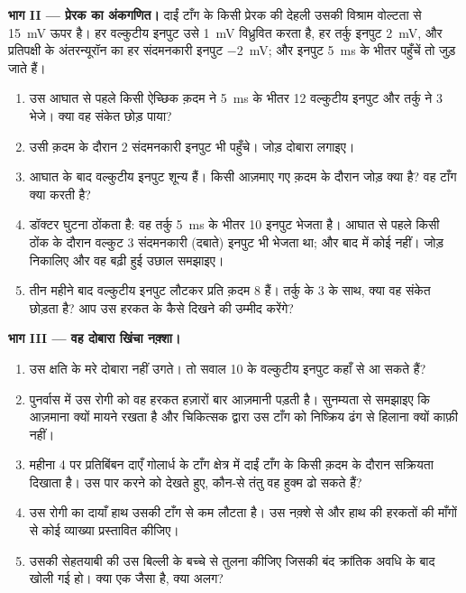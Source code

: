 \begin{problem}
\medskip
\noindent\textbf{भाग II --- प्रेरक  का अंकगणित।}
दाईं टाँग के किसी प्रेरक  की देहली उसकी विश्राम वोल्टता से
\qty{15}{mV} ऊपर है। हर वल्कुटीय इनपुट उसे \qty{1}{mV} विध्रुवित करता है,
हर तर्कु इनपुट \qty{2}{mV}, और प्रतिपक्षी के अंतरन्यूरॉन का हर संदमनकारी
इनपुट \qty{-2}{mV}; और इनपुट \qty{5}{ms} के भीतर पहुँचें तो जुड़ जाते हैं।
\begin{enumerate}[resume]
  \item उस आघात से पहले किसी ऐच्छिक क़दम ने \qty{5}{ms} के भीतर 12
        वल्कुटीय इनपुट और तर्कु ने 3 भेजे। क्या वह  संकेत छोड़ पाया?
  \item उसी क़दम के दौरान 2 संदमनकारी इनपुट भी पहुँचे। जोड़ दोबारा लगाइए।
  \item आघात के बाद वल्कुटीय इनपुट शून्य हैं। किसी आज़माए गए क़दम के दौरान
        जोड़ क्या है? वह टाँग क्या करती है?
  \item डॉक्टर घुटना ठोंकता है: वह तर्कु \qty{5}{ms} के भीतर 10 इनपुट भेजता
        है। आघात से पहले किसी ठोंक के दौरान वल्कुट 3 संदमनकारी (दबाते)
        इनपुट भी भेजता था; और बाद में कोई नहीं। जोड़ निकालिए और वह बढ़ी हुई
        उछाल समझाइए।
  \item तीन महीने बाद वल्कुटीय इनपुट लौटकर प्रति क़दम 8 हैं। तर्कु के 3 के
        साथ, क्या वह  संकेत छोड़ता है? आप उस हरकत के कैसे दिखने की
        उम्मीद करेंगे?
\end{enumerate}

\medskip
\noindent\textbf{भाग III --- वह दोबारा खिंचा नक़्शा।}
\begin{enumerate}[resume]
  \item उस क्षति के मरे  दोबारा नहीं उगते। तो सवाल 10 के वल्कुटीय
        इनपुट कहाँ से आ सकते हैं?
  \item पुनर्वास में उस रोगी को वह हरकत हज़ारों बार आज़मानी पड़ती है।
        सुनम्यता से समझाइए कि आज़माना क्यों मायने रखता है और चिकित्सक द्वारा
        उस टाँग को निष्क्रिय ढंग से हिलाना क्यों काफ़ी नहीं।
  \item महीना 4 पर प्रतिबिंबन दाएँ गोलार्ध के टाँग क्षेत्र में दाईं टाँग के
        किसी क़दम के दौरान सक्रियता दिखाता है। उस पार करने को देखते हुए,
        कौन-से तंतु वह हुक्म ढो सकते हैं?
  \item उस रोगी का दायाँ हाथ उसकी टाँग से कम लौटता है। उस नक़्शे से और हाथ
        की हरकतों की माँगों से कोई व्याख्या प्रस्तावित कीजिए।
  \item उसकी सेहतयाबी की उस बिल्ली के बच्चे से तुलना कीजिए जिसकी बंद 
        क्रांतिक अवधि के बाद खोली गई हो। क्या एक जैसा है, क्या अलग?
\end{enumerate}


\end{problem}

